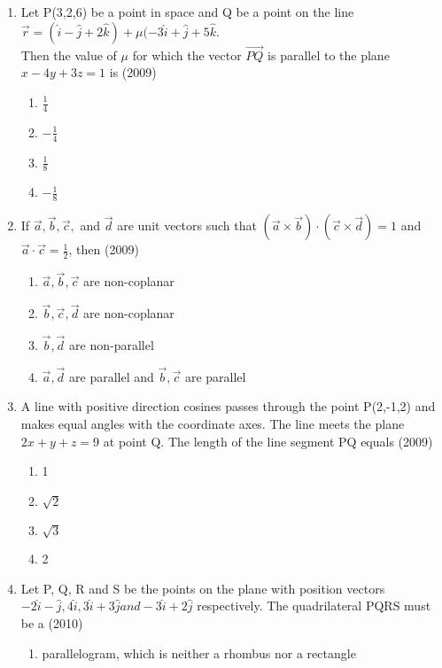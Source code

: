 \documentclass[journal,12pt,twocolumn]{IEEEtran}
\theoremstyle{remark}
\begin{document}
\begin{enumerate}
    \item Let P(3,2,6) be a point in space and Q be a point on the line \\ 
    $\vec{r} = (\hat{i} - \hat{j} + 2\hat{k}) + \mu(-3\hat{i} +\hat{j}+5\hat{k}.$
    \\ Then the value of $\mu$ for which the vector $\overrightarrow{PQ}$ is parallel to the plane $x-4y+3z=1$ is
    \hfill{(2009)}
    \begin{enumerate}[label=(\alph*)]
    \item $\frac{1}{4}$
    \item $-\frac{1}{4}$
    \item $\frac{1}{8}$
    \item $-\frac{1}{8}$
    \end{enumerate}
    \item If $\vec{a}, \vec{b}, \vec{c},$ and $\vec{d}$ are unit vectors such that $(\vec{a} \times \vec{b}) \cdot (\vec{c} \times \vec{d}) = 1$ and $\vec{a} \cdot \vec{c} = \frac{1}{2}$, then
    \hfill{(2009)}
    \begin{enumerate}[label=(\alph*)]
    \item $\vec{a}, \vec{b}, \vec{c}$ are non-coplanar
    \item $\vec{b}, \vec{c}, \vec{d}$ are non-coplanar
    \item $\vec{b}, \vec{d}$ are non-parallel
    \item $\vec{a}, \vec{d}$ are parallel and $\vec{b}, \vec{c}$ are parallel 
    \end{enumerate}
    \item A line with positive direction cosines passes through the point P(2,-1,2) and makes equal angles with the coordinate axes. The line meets the plane $2x+y+z=9$ at point Q. The length of the line segment PQ equals 
    \hfill{(2009)}
    \begin{enumerate}[label=(\alph*)]
    \item 1
    \item $\sqrt{2}$
    \item $\sqrt{3}$
    \item 2
    \end{enumerate}
    \item Let P, Q, R and S be the points on the plane with position vectors $-2\hat{i} -\hat{j},4\hat{i},3\hat{i}+3\hat{j} and -3\hat{i}+2\hat{j}$ respectively. The quadrilateral PQRS must be a 
    \hfill{(2010)}
    \begin{enumerate}[label=(\alph*)]
    \item parallelogram, which is neither a rhombus nor a rectangle 

\end{enumerate}
\end{enumerate}
\end{document}
